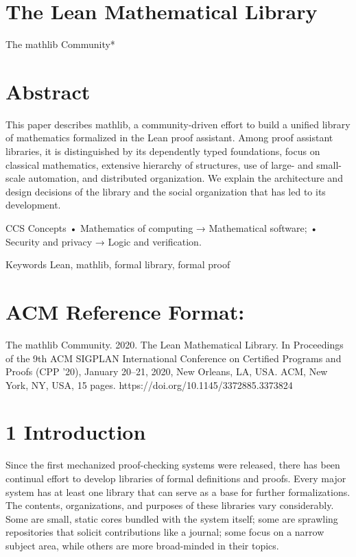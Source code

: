 \documentclass[
]{article}
\author{}
\date{}
\begin{document}
\section{The Lean Mathematical
Library}\label{the-lean-mathematical-library}

The mathlib Community*

\section{Abstract}\label{abstract}

This paper describes mathlib, a community-driven effort to build a
unified library of mathematics formalized in the Lean proof assistant.
Among proof assistant libraries, it is distinguished by its dependently
typed foundations, focus on classical mathematics, extensive hierarchy
of structures, use of large- and small-scale automation, and distributed
organization. We explain the architecture and design decisions of the
library and the social organization that has led to its development.

CCS Concepts • Mathematics of computing → Mathematical software; •
Security and privacy → Logic and verification.

Keywords Lean, mathlib, formal library, formal proof

\section{ACM Reference Format:}\label{acm-reference-format}

The mathlib Community. 2020. The Lean Mathematical Library. In
Proceedings of the 9th ACM SIGPLAN International Conference on Certified
Programs and Proofs (CPP '20), January 20--21, 2020, New Orleans, LA,
USA. ACM, New York, NY, USA, 15 pages.
https://doi.org/10.1145/3372885.3373824

\section{1 Introduction}\label{introduction}

Since the first mechanized proof-checking systems were released, there
has been continual effort to develop libraries of formal definitions and
proofs. Every major system has at least one library that can serve as a
base for further formalizations. The contents, organizations, and
purposes of these libraries vary considerably. Some are small, static
cores bundled with the system itself; some are sprawling repositories
that solicit contributions like a journal; some focus on a narrow
subject area, while others are more broad-minded in their topics.
\end{document}
